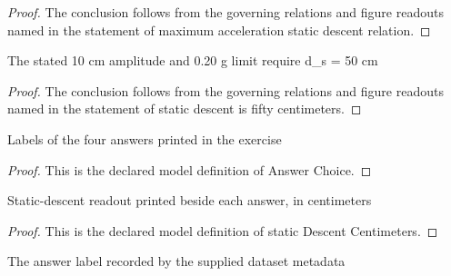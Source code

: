 \begin{proof}
  The conclusion follows from the governing relations and figure readouts named in the statement of maximum acceleration static descent relation.
\end{proof}
\begin{lemma}
  \label{lem:physics:phyx-mini-0283:phyxminiproblems-problemphyxmini0283-static-descent-is-fifty-centimeters}
  The stated 10 cm amplitude and 0.20 g limit require d\_s = 50 cm
\end{lemma}
\begin{proof}
  The conclusion follows from the governing relations and figure readouts named in the statement of static descent is fifty centimeters.
\end{proof}
\begin{definition}
  \label{def:physics:phyx-mini-0283:phyxminiproblems-problemphyxmini0283-answerchoice}
  Labels of the four answers printed in the exercise
\end{definition}
\begin{proof}
  This is the declared model definition of Answer Choice.
\end{proof}
\begin{definition}
  \label{def:physics:phyx-mini-0283:phyxminiproblems-problemphyxmini0283-answerchoice-staticdescentcentimeters}
  Static-descent readout printed beside each answer, in centimeters
\end{definition}
\begin{proof}
  This is the declared model definition of static Descent Centimeters.
\end{proof}
\begin{definition}
  \label{def:physics:phyx-mini-0283:phyxminiproblems-problemphyxmini0283-recordedanswerchoice}
  The answer label recorded by the supplied dataset metadata
\end{definition}
